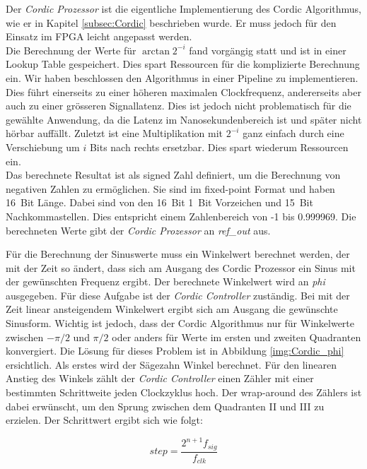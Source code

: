Der \textit{Cordic Prozessor} ist die eigentliche Implementierung des Cordic Algorithmus, wie er in Kapitel \ref{subsec:Cordic} beschrieben wurde. Er muss jedoch für den Einsatz im FPGA leicht angepasst werden. \\
Die Berechnung der Werte für \(\arctan{2^{-i}}\) fand vorgängig statt und ist in einer Lookup Table gespeichert. Dies spart Ressourcen für die komplizierte Berechnung ein. Wir haben beschlossen den Algorithmus in einer Pipeline zu implementieren. Dies führt einerseits zu einer höheren maximalen Clockfrequenz, andererseits aber auch zu einer grösseren Signallatenz. Dies ist jedoch nicht problematisch für die gewählte Anwendung, da die Latenz im Nanosekundenbereich ist und später nicht hörbar auffällt. Zuletzt ist eine Multiplikation mit \(2^{-i}\) ganz einfach durch eine Verschiebung um \(i\) Bits nach rechts ersetzbar. Dies spart wiederum Ressourcen ein.\\
Das berechnete Resultat ist als signed Zahl definiert, um die Berechnung von negativen Zahlen zu ermöglichen. Sie sind im fixed-point Format und haben \SI{16}{Bit} Länge. Dabei sind von den \SI{16}{Bit} \SI{1}{Bit} Vorzeichen und \SI{15}{Bit} Nachkommastellen. Dies entspricht einem Zahlenbereich von -1 bis 0.999969. Die berechneten Werte gibt der \textit{Cordic Prozessor} an \textit{ref\_out} aus.

Für die Berechnung der Sinuswerte muss ein Winkelwert berechnet werden, der mit der Zeit so ändert, dass sich am Ausgang des Cordic Prozessor ein Sinus mit der gewünschten Frequenz ergibt. Der berechnete Winkelwert wird an \textit{phi} ausgegeben. Für diese Aufgabe ist der \textit{Cordic Controller} zuständig. Bei mit der Zeit linear ansteigendem Winkelwert ergibt sich am Ausgang die gewünschte Sinusform. Wichtig ist jedoch, dass der Cordic Algorithmus nur für Winkelwerte zwischen \(-\pi/2\) und \(\pi/2\) oder anders für Werte im ersten und zweiten Quadranten konvergiert. Die Lösung für dieses Problem ist in Abbildung \ref{img:Cordic_phi} ersichtlich. 
Als erstes wird der Sägezahn Winkel berechnet. Für den linearen Anstieg des Winkels zählt der \textit{Cordic Controller} einen Zähler mit einer bestimmten Schrittweite jeden Clockzyklus hoch. Der wrap-around des Zählers ist dabei erwünscht, um den Sprung zwischen dem Quadranten II und III zu erzielen. Der Schrittwert ergibt sich wie folgt:

\begin{equation}
step = \frac{2^{n+1}f_{sig}}{f_{clk}}
\label{equ:cordic_step}
\end{equation} 

